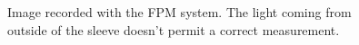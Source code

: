 \begin{figure}[!ht]
	\begin{center}
		
	\end{center}
	\caption[Image recorded with the FPM system]{Image recorded with the FPM system. The light coming from outside of the sleeve doesn't permit a correct measurement.}
	\label{chap4:FPM}
\end{figure}
